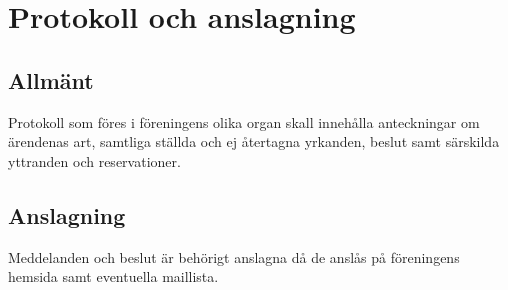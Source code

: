 \section{Protokoll och anslagning}
\subsection{Allmänt} 
Protokoll som föres i föreningens olika organ skall innehålla anteckningar om ärendenas art, samtliga ställda och ej återtagna yrkanden, beslut samt särskilda yttranden och reservationer.

\subsection{Anslagning}
\label{sec:protokoll:anslagning}
Meddelanden och beslut är behörigt anslagna då de anslås på föreningens hemsida samt eventuella maillista.
